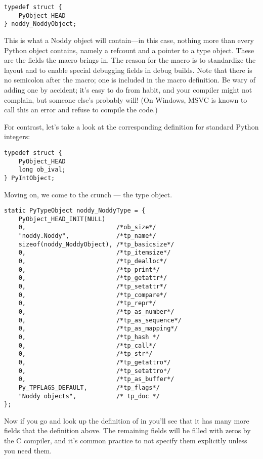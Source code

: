 \begin{verbatim}
typedef struct {
    PyObject_HEAD
} noddy_NoddyObject;
\end{verbatim}

This is what a Noddy object will contain---in this case, nothing more
than every Python object contains, namely a refcount and a pointer to a type
object.  These are the fields the  macro brings
in.  The reason for the macro is to standardize the layout and to
enable special debugging fields in debug builds.  Note that there is
no semicolon after the  macro; one is included in
the macro definition.  Be wary of adding one by accident; it's easy to
do from habit, and your compiler might not complain, but someone
else's probably will!  (On Windows, MSVC is known to call this an
error and refuse to compile the code.)

For contrast, let's take a look at the corresponding definition for
standard Python integers:

\begin{verbatim}
typedef struct {
    PyObject_HEAD
    long ob_ival;
} PyIntObject;
\end{verbatim}

Moving on, we come to the crunch --- the type object.

\begin{verbatim}
static PyTypeObject noddy_NoddyType = {
    PyObject_HEAD_INIT(NULL)
    0,                         /*ob_size*/
    "noddy.Noddy",             /*tp_name*/
    sizeof(noddy_NoddyObject), /*tp_basicsize*/
    0,                         /*tp_itemsize*/
    0,                         /*tp_dealloc*/
    0,                         /*tp_print*/
    0,                         /*tp_getattr*/
    0,                         /*tp_setattr*/
    0,                         /*tp_compare*/
    0,                         /*tp_repr*/
    0,                         /*tp_as_number*/
    0,                         /*tp_as_sequence*/
    0,                         /*tp_as_mapping*/
    0,                         /*tp_hash */
    0,                         /*tp_call*/
    0,                         /*tp_str*/
    0,                         /*tp_getattro*/
    0,                         /*tp_setattro*/
    0,                         /*tp_as_buffer*/
    Py_TPFLAGS_DEFAULT,        /*tp_flags*/
    "Noddy objects",           /* tp_doc */
};
\end{verbatim}

Now if you go and look up the definition of  in
 you'll see that it has many more fields that the
definition above.  The remaining fields will be filled with zeros by
the C compiler, and it's common practice to not specify them
explicitly unless you need them.

